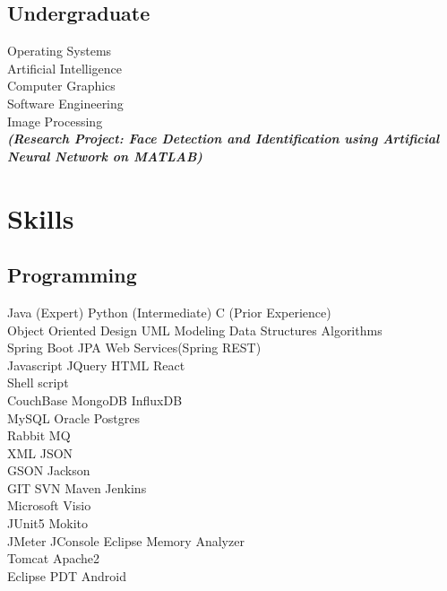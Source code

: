 \documentclass[]{kushal-resume}
\begin{document}
\begin{minipage}[t]{0.33\textwidth}
\subsection{Undergraduate}
Operating Systems \\
Artificial Intelligence  \\
Computer Graphics  \\
Software Engineering \\
Image Processing \\
{\footnotesize \textit{\textbf{(Research Project: Face Detection and Identification using Artificial Neural Network on MATLAB) }}} \\
\sectionsep


\section{Skills}
\subsection{Programming}
Java (Expert) \textbullet{} Python (Intermediate) \textbullet{} C (Prior Experience) \\
Object Oriented Design  \textbullet{} UML Modeling \textbullet{} Data Structures \textbullet{} Algorithms \\
Spring Boot \textbullet{} JPA \textbullet{} Web Services(Spring REST) \\
Javascript \textbullet{} JQuery \textbullet{} HTML \textbullet{} React \\
Shell script \\
CouchBase \textbullet{} MongoDB \textbullet{} InfluxDB  \\
MySQL \textbullet{} Oracle \textbullet{} Postgres \\
Rabbit MQ \\
XML \textbullet{} JSON \\
GSON \textbullet{} Jackson \\
GIT \textbullet{} SVN \textbullet{} Maven \textbullet{} Jenkins \\
Microsoft Visio \\
JUnit5 \textbullet{} Mokito \\
JMeter \textbullet{} JConsole \textbullet{} Eclipse Memory Analyzer \\
Tomcat \textbullet{} Apache2 \\
Eclipse PDT \textbullet{} Android \\
\sectionsep



%
%

\end{minipage} 
\end{document}
